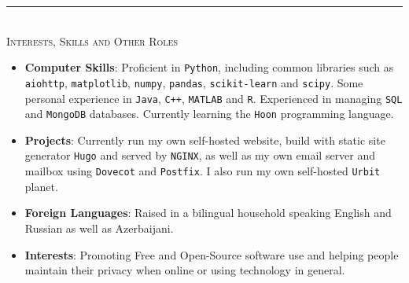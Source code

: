 \documentclass[10pt]{article}
\begin{document}
	\rule{\textwidth}{0.4pt}\\[0.2cm]
	\textsc{\Large Interests, Skills and Other Roles}
	\begin{itemize}[left=0pt]
		\item \textbf{Computer Skills}: Proficient in \texttt{Python}, including common libraries such as \texttt{aiohttp}, \texttt{matplotlib}, \texttt{numpy}, \texttt{pandas}, \texttt{scikit-learn} and \texttt{scipy}. Some personal experience in \texttt{Java}, \texttt{C++}, \texttt{MATLAB} and \texttt{R}. Experienced in managing \texttt{SQL} and \texttt{MongoDB} databases. Currently learning the \texttt{Hoon} programming language.
		\item \textbf{Projects}: Currently run my own self-hosted website, build with static site generator \texttt{Hugo} and served by \texttt{NGINX}, as well as my own email server and mailbox using \texttt{Dovecot} and \texttt{Postfix}. I also run my own self-hosted \texttt{Urbit} planet. 
		\item \textbf{Foreign Languages}: Raised in a bilingual household speaking English and Russian as well as Azerbaijani.
		\item \textbf{Interests}: Promoting Free and Open-Source software use and helping people maintain their privacy when online or using technology in general. 
	\end{itemize}
\end{document}
